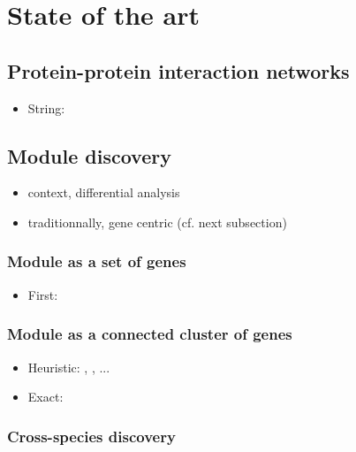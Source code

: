 \chapter{State of the art}

\section{Protein-protein interaction networks}

	\begin{itemize}
		\item String: \cite{szklarczyk2014string}
	\end{itemize}

\section{Module discovery}

	\begin{itemize}
		\item context, differential analysis
		\item traditionnally, gene centric (cf. next subsection)
	\end{itemize}

	\subsection{Module as a set of genes}

		\begin{itemize}
			\item First: \cite{golub1999molecular}
		\end{itemize}

	\subsection{Module as a connected cluster of genes}

		\begin{itemize}
			\item Heuristic: \cite{ideker2002discovering}, \cite{mitra2013integrative}, ...
			\item Exact: \cite{dittrich2008identifying}
		\end{itemize}

	\subsection{Cross-species discovery}

